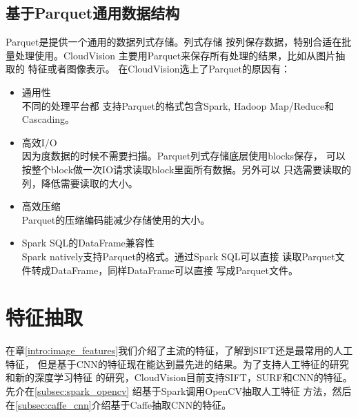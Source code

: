 \subsection{基于Parquet通用数据结构}
Parquet是提供一个通用的数据列式存储。列式存储
按列保存数据，特别合适在批量处理使用。CloudVision
主要用Parquet来保存所有处理的结果，比如从图片抽取的
特征或者图像表示。
在CloudVision选上了Parquet的原因有：
\begin{itemize}
  \item 通用性 \\
        不同的处理平台都
        支持Parquet的格式包含Spark, Hadoop Map/Reduce和Cascading。
  \item 高效I/O \\
        因为度数据的时候不需要扫描。Parquet列式存储底层使用blocks保存，
        可以按整个block做一次IO请求读取block里面所有数据。另外可以
        只选需要读取的列，降低需要读取的大小。
  \item 高效压缩 \\
        Parquet的压缩编码能减少存储使用的大小。
  \item Spark SQL的DataFrame兼容性 \\
        Spark natively支持Parquet的格式。通过Spark SQL可以直接
        读取Parquet文件转成DataFrame，同样DataFrame可以直接
        写成Parquet文件。
\end{itemize}



\section{特征抽取}
\label{sec:feature-extraction}
在章\ref{intro:image_features}我们介绍了主流的特征，了解到SIFT还是最常用的人工特征，
但是基于CNN的特征现在能达到最先进的结果。为了支持人工特征的研究和新的深度学习特征
的研究，CloudVision目前支持SIFT，SURF和CNN的特征。先介在\ref{subsec:spark_opencv}
绍基于Spark调用OpenCV抽取人工特征
方法，然后在\ref{subsec:caffe_cnn}介绍基于Caffe抽取CNN的特征。

